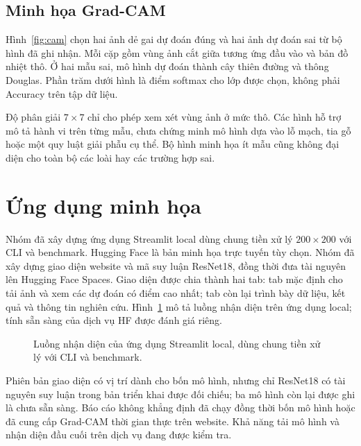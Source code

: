 \documentclass[conference]{IEEEtran}
\begin{document}
\subsection{Minh họa Grad-CAM}
Hình~\ref{fig:cam} chọn hai ảnh dẻ gai dự đoán đúng và hai ảnh dự đoán sai từ bộ hình đã ghi nhận. Mỗi cặp gồm vùng ảnh cắt giữa tương ứng đầu vào và bản đồ nhiệt thô. Ở hai mẫu sai, mô hình dự đoán thành cây thiên đường và thông Douglas. Phần trăm dưới hình là điểm softmax cho lớp được chọn, không phải Accuracy trên tập dữ liệu.



Độ phân giải $7\times7$ chỉ cho phép xem xét vùng ảnh ở mức thô. Các hình hỗ trợ mô tả hành vi trên từng mẫu, chưa chứng minh mô hình dựa vào lỗ mạch, tia gỗ hoặc một quy luật giải phẫu cụ thể. Bộ hình minh họa ít mẫu cũng không đại diện cho toàn bộ các loài hay các trường hợp sai.

\section{Ứng dụng minh họa}
Nhóm đã xây dựng ứng dụng Streamlit local dùng chung tiền xử lý $200\times200$ với CLI và benchmark. Hugging Face là bản minh họa trực tuyến tùy chọn. Nhóm đã xây dựng giao diện website và mã suy luận ResNet18, đồng thời đưa tài nguyên lên Hugging Face Spaces. Giao diện được chia thành hai tab: tab mặc định cho tải ảnh và xem các dự đoán có điểm cao nhất; tab còn lại trình bày dữ liệu, kết quả và thông tin nghiên cứu. Hình~\ref{fig:web} mô tả luồng nhận diện trên ứng dụng local; tính sẵn sàng của dịch vụ HF được đánh giá riêng.

\begin{figure}[!ht]
\centering\small
{}
\caption{Luồng nhận diện của ứng dụng Streamlit local, dùng chung tiền xử lý với CLI và benchmark.}
\label{fig:web}
\end{figure}

Phiên bản giao diện có vị trí dành cho bốn mô hình, nhưng chỉ ResNet18 có tài nguyên suy luận trong bản triển khai được đối chiếu; ba mô hình còn lại được ghi là chưa sẵn sàng. Báo cáo không khẳng định đã chạy đồng thời bốn mô hình hoặc đã cung cấp Grad-CAM thời gian thực trên website. Khả năng tải mô hình và nhận diện đầu cuối trên dịch vụ đang được kiểm tra.
\end{document}
